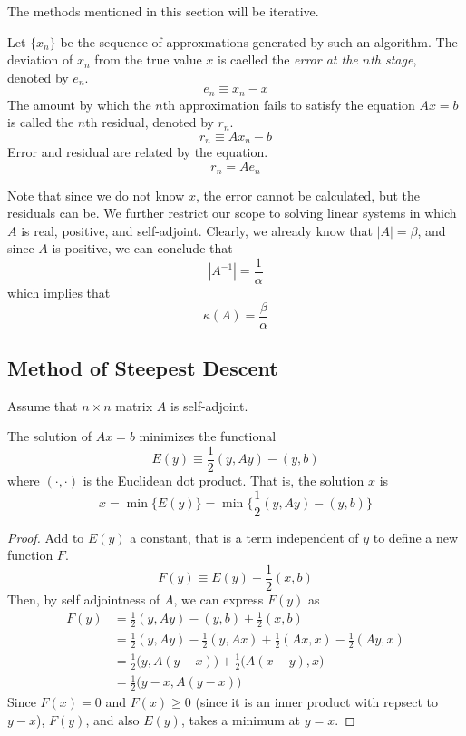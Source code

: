 \documentclass{article}
\begin{document}
  The methods mentioned in this section will be iterative. 
  \begin{definition}
  Let $\{ x_n\}$ be the sequence of approxmations generated by such an algorithm. The deviation of $x_n$ from the true value $x$ is caelled the \textit{error at the $n$th stage}, denoted by $e_n$. 
  \[e_n \equiv x_n - x\]
  The amount by which the $n$th approximation fails to satisfy the equation $Ax = b$ is called the $n$th residual, denoted by $r_n$. 
  \[r_n \equiv A x_n - b\]
  Error and residual are related by the equation. 
  \[r_n = A e_n\]
  \end{definition}
  Note that since we do not know $x$, the error cannot be calculated, but the residuals can be. We further restrict our scope to solving linear systems in which $A$ is real, positive, and self-adjoint. Clearly, we already know that $|A| = \beta$, and since $A$ is positive, we can conclude that 
  \[|A^{-1}| = \frac{1}{\alpha}\]
  which implies that
  \[\kappa(A) = \frac{\beta}{\alpha}\]

  \subsection{Method of Steepest Descent}

    Assume that $n \times n$ matrix $A$ is self-adjoint.
    \begin{theorem}
    The solution of $Ax = b$ minimizes the functional 
    \[E (y) \equiv \frac{1}{2} (y, A y) - (y, b)\]
    where $(\cdot, \cdot)$ is the Euclidean dot product. That is, the solution $x$ is
    \[x = \min \big\{ E(y) \big\} = \min \Big\{ \frac{1}{2} (y, Ay) - (y, b) \Big\}\]
    \end{theorem}
    \begin{proof}
    Add to $E(y)$ a constant, that is a term independent of $y$ to define a new function $F$. 
    \[F(y) \equiv E(y) + \frac{1}{2} (x, b)\]
    Then, by self adjointness of $A$, we can express $F(y)$ as 
    \begin{align*}
        F(y) & = \frac{1}{2} (y, Ay) - (y, b) + \frac{1}{2} (x, b) \\
        & = \frac{1}{2} (y, Ay) - \frac{1}{2} (y, Ax) + \frac{1}{2} (Ax, x) - \frac{1}{2} (Ay, x) \\
        & = \frac{1}{2} \big( y, A(y-x)\big) + \frac{1}{2} \big( A(x-y), x\big) \\
        & = \frac{1}{2} \big( y - x, A(y - x)\big) 
    \end{align*}
    Since $F(x) = 0$ and $F(x) \geq 0$ (since it is an inner product with repsect to $y-x$), $F(y)$, and also $E(y)$, takes a minimum at $y =x$. 
    \end{proof}
\end{document}
